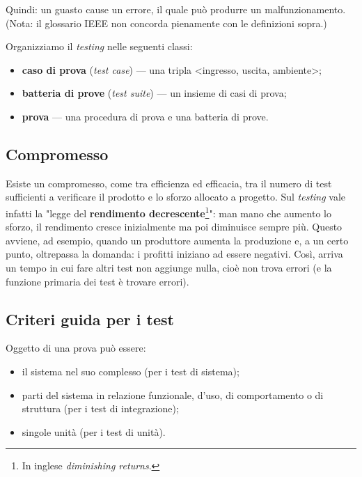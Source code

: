 \documentclass[a4paper]{article}
\begin{document}
		
Quindi: un guasto cause un errore, il quale può produrre un malfunzionamento. (Nota: il glossario IEEE non concorda pienamente con le definizioni sopra.)
		
Organizziamo il \emph{testing} nelle seguenti classi:
		
	\begin{itemize}
		
			
	\item \textbf{caso di prova} (\emph{test case}) --- una tripla \textless{}ingresso, uscita, ambiente\textgreater{};
			
	\item \textbf{batteria di prove} (\emph{test suite}) --- un insieme di casi di prova;
			
	\item \textbf{prova} --- una procedura di prova e una batteria di prove.
		
	\end{itemize}


		
	\subsection{Compromesso}

		
Esiste un compromesso, come tra efficienza ed efficacia, tra il numero di test sufficienti a verificare il prodotto e lo sforzo allocato a progetto. Sul \emph{testing} vale infatti la "legge del \textbf{rendimento decrescente}\footnote{In inglese \emph{diminishing returns}.}": man mano che aumento lo sforzo, il rendimento cresce inizialmente ma poi diminuisce sempre più. Questo avviene, ad esempio, quando un produttore aumenta la produzione e, a un certo punto, oltrepassa la domanda: i profitti iniziano ad essere negativi. Così, arriva un tempo in cui fare altri test non aggiunge nulla, cioè non trova errori (e la funzione primaria dei test è trovare errori).

		
	\subsection{Criteri guida per i test}

		
Oggetto di una prova può essere:
		
	\begin{itemize}
		
			
	\item il sistema nel suo complesso (per i test di sistema);
			
	\item parti del sistema in relazione funzionale, d'uso, di comportamento o di struttura (per i test di integrazione);
			
	\item singole unità (per i test di unità).
		
	\end{itemize}
\end{document}
